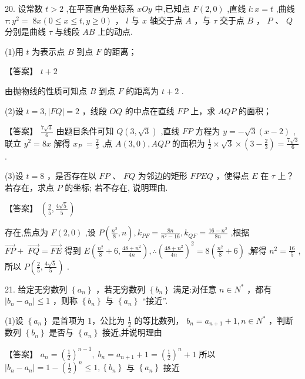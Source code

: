\documentclass[10pt]{article}
\begin{document}
20. 设常数 \(t > 2\) ,在平面直角坐标系 \({xOy}\) 中,已知点 \(F\left( {2,0}\right)\) ,直线 \(l : x = t\) ,曲线 \(\tau  : {y}^{2} = \; {8x}\left( {0 \leq  x \leq  t,y \geq  0}\right)\) ， \(l\) 与 \(x\) 轴交于点 \(A\) ，与 \(\tau\) 交于点 \(B\) ， \(P\) 、 \(Q\) 分别是曲线 \(\tau\) 与线段 \({AB}\) 上的动点.

(1)用 \(t\) 为表示点 \(B\) 到点 \(F\) 的距离；

【答案】 \(t + 2\)

由抛物线的性质可知点 \(B\) 到点 \(F\) 的距离为 \(t + 2\) .

(2)设 \(t = 3,\left| {FQ}\right|  = 2\) ，线段 \({OQ}\) 的中点在直线 \({FP}\) 上，求 \({AQP}\) 的面积；

【答案】 \(\frac{7\sqrt{3}}{6}\) 由题目条件可知 \(Q\left( {3,\sqrt{3}}\right)\) ,直线 \({FP}\) 方程为 \(y =  - \sqrt{3}\left( {x - 2}\right)\) ,联立 \({y}^{2} = {8x}\) 解得 \({x}_{P} \; = \frac{2}{3}\) ,点 \(A\left( {3,0}\right) ,{AQP}\) 的面积为 \(\frac{1}{2} \times  \sqrt{3} \times  \left( {3 - \frac{2}{3}}\right)  = \frac{7\sqrt{3}}{6}\) .

(3)设 \(t = 8\) ，是否存在以 \({FP}\) 、 \({FQ}\) 为邻边的矩形 \({FPEQ}\) ，使得点 \(E\) 在 \(\tau\) 上？若存在，求点 \(P\) 的坐标; 若不存在, 说明理由.

【答案】 \(\left( {\frac{2}{5},\frac{4\sqrt{5}}{5}}\right)\)

存在,焦点为 \(F\left( {2,0}\right)\) ,设 \(P\left( {\frac{{n}^{2}}{8},n}\right) ,{k}_{PF} = \frac{8n}{{n}^{2} - {16}},{k}_{QF} = \frac{{16} - {n}^{2}}{8n}\) ,根据 \(\overrightarrow{FP} + \; \overrightarrow{FQ} = \overrightarrow{FE}\) 得到 \(E\left( {\frac{{n}^{2}}{8} + 6,\frac{{48} + {n}^{2}}{4n}}\right) ,\therefore {\left( \frac{{48} + {n}^{2}}{4n}\right) }^{2} = 8\left( {\frac{{n}^{2}}{8} + 6}\right)\) ,解得 \({n}^{2} = \frac{16}{5}\) ,所以 \(P\left( {\frac{2}{5},\frac{4\sqrt{5}}{5}}\right)\) .

21. 给定无穷数列 \(\left\{  {a}_{n}\right\}\) ，若无穷数列 \(\left\{  {b}_{n}\right\}\) 满足:对任意 \(n \in  {N}^{ * }\) ，都有 \(\left| {{b}_{n} - {a}_{n}}\right|  \leq  1\) ，则称 \(\left\{  {b}_{n}\right\}\) 与 \(\left\{  {a}_{n}\right\}\) “接近”.

(1)设 \(\left\{  {a}_{n}\right\}\) 是首项为 1，公比为 \(\frac{1}{2}\) 的等比数列， \({b}_{n} = {a}_{n + 1} + 1,n \in  {N}^{ * }\) ，判断数列 \(\left\{  {b}_{n}\right\}\) 是否与 \(\left\{  {a}_{n}\right\}\) 接近,并说明理由

【答案】 \({a}_{n} = {\left( \frac{1}{2}\right) }^{n - 1},\;{b}_{n} = {a}_{n + 1} + 1 = {\left( \frac{1}{2}\right) }^{n} + 1\) 所以 \(\left| {{b}_{n} - {a}_{n}}\right|  = 1 - {\left( \frac{1}{2}\right) }^{n} \leq  1,\left\{  {b}_{n}\right\}\) 与 \(\left\{  {a}_{n}\right\}\) 接近
\end{document}
